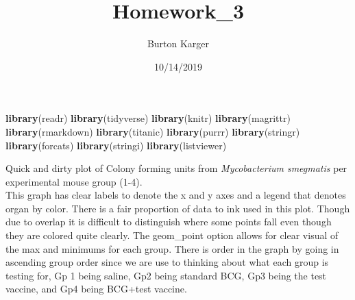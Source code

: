 \documentclass[]{article}
\title{Homework\_3}
\author{Burton Karger}
\date{10/14/2019}
\newenvironment{Shaded}{\begin{snugshade}}{\end{snugshade}}
\newcommand{\DataTypeTok}[1]{\textcolor[rgb]{0.13,0.29,0.53}{#1}}
\newcommand{\KeywordTok}[1]{\textcolor[rgb]{0.13,0.29,0.53}{\textbf{#1}}}
\newcommand{\NormalTok}[1]{#1}
\newcommand{\OperatorTok}[1]{\textcolor[rgb]{0.81,0.36,0.00}{\textbf{#1}}}
\newcommand{\OtherTok}[1]{\textcolor[rgb]{0.56,0.35,0.01}{#1}}
\newcommand{\StringTok}[1]{\textcolor[rgb]{0.31,0.60,0.02}{#1}}
\begin{document}
\maketitle

\begin{Shaded}
\begin{Highlighting}[]
\KeywordTok{library}\NormalTok{(readr)}
\KeywordTok{library}\NormalTok{(tidyverse)}
\KeywordTok{library}\NormalTok{(knitr)}
\KeywordTok{library}\NormalTok{(magrittr)}
\KeywordTok{library}\NormalTok{(rmarkdown)}
\KeywordTok{library}\NormalTok{(titanic)}
\KeywordTok{library}\NormalTok{(purrr)}
\KeywordTok{library}\NormalTok{(stringr)}
\KeywordTok{library}\NormalTok{(forcats)}
\KeywordTok{library}\NormalTok{(stringi)}
\KeywordTok{library}\NormalTok{(listviewer)}
\end{Highlighting}
\end{Shaded}

Quick and dirty plot of Colony forming units from \emph{Mycobacterium
smegmatis} per experimental mouse group (1-4).\\
This graph has clear labels to denote the x and y axes and a legend that
denotes organ by color. There is a fair proportion of data to ink used
in this plot. Though due to overlap it is difficult to distinguish where
some points fall even though they are colored quite clearly. The
geom\_point option allows for clear visual of the max and minimums for
each group. There is order in the graph by going in ascending group
order since we are use to thinking about what each group is testing for,
Gp 1 being saline, Gp2 being standard BCG, Gp3 being the test vaccine,
and Gp4 being BCG+test vaccine.

\begin{Shaded}
\end{Shaded}
\end{document}
